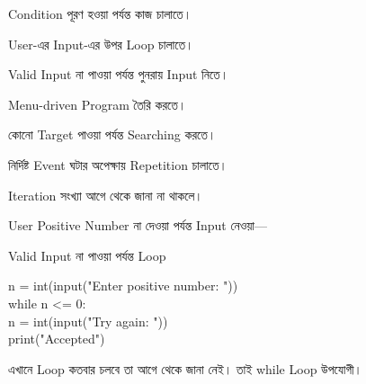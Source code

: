

\begin{compacttwocolpoints}

\item Condition পূরণ হওয়া পর্যন্ত কাজ চালাতে।

\item User-এর Input-এর উপর Loop চালাতে।

\item Valid Input না পাওয়া পর্যন্ত পুনরায় Input নিতে।

\item Menu-driven Program তৈরি করতে।

\item কোনো Target পাওয়া পর্যন্ত Searching করতে।

\item নির্দিষ্ট Event ঘটার অপেক্ষায় Repetition চালাতে।

\item Iteration সংখ্যা আগে থেকে জানা না থাকলে।

\end{compacttwocolpoints}



User Positive Number না দেওয়া পর্যন্ত Input নেওয়া—

\begin{examplebox}{Valid Input না পাওয়া পর্যন্ত Loop}

\begin{codebox}
\begin{english}
\ttfamily
n = int(input("Enter positive number: "))\\[0.5mm]
while n <= 0:\\
\hspace*{4mm}n = int(input("Try again: "))\\[0.5mm]
print("Accepted")
\end{english}
\end{codebox}

এখানে Loop কতবার চলবে তা আগে থেকে জানা নেই।
তাই
\textenglish{\ttfamily while}
Loop উপযোগী।

\end{examplebox}

